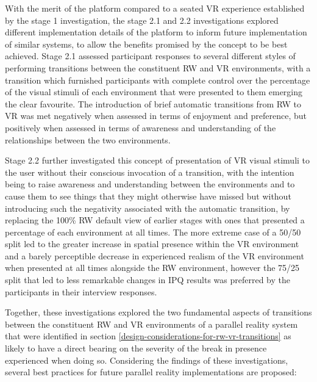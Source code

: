 With the merit of the platform compared to a seated VR experience established by the stage 1 investigation, the stage 2.1 and 2.2 investigations explored different implementation details of the platform to inform future implementation of similar systems, to allow the benefits promised by the concept to be best achieved. Stage 2.1 assessed participant responses to several different styles of performing transitions between the constituent RW and VR environments, with a transition which furnished participants with complete control over the percentage of the visual stimuli of each environment that were presented to them emerging the clear favourite. The introduction of brief automatic transitions from RW to VR was met negatively when assessed in terms of enjoyment and preference, but positively when assessed in terms of awareness and understanding of the relationships between the two environments.

Stage 2.2 further investigated this concept of presentation of VR visual stimuli to the user without their conscious invocation of a transition, with the intention being to raise awareness and understanding between the environments and to cause them to see things that they might otherwise have missed but without introducing such the negativity associated with the automatic transition, by replacing the 100\% RW default view of earlier stages with ones that presented a percentage of each environment at all times. The more extreme case of a 50/50 split led to the greater increase in spatial presence within the VR environment and a barely perceptible decrease in experienced realism of the VR environment when presented at all times alongside the RW environment, however the 75/25 split that led to less remarkable changes in IPQ results was preferred by the participants in their interview responses.

Together, these investigations explored the two fundamental aspects of transitions between the constituent RW and VR environments of a parallel reality system that were identified in section \ref{design-considerations-for-rw-vr-transitions} as likely to have a direct bearing on the severity of the break in presence experienced when doing so. Considering the findings of these investigations, several best practices for future parallel reality implementations are proposed:

